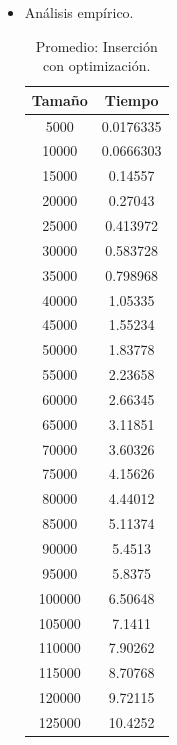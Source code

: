 \documentclass[a4paper,12pt,twoside]{article} %
\begin{document}
\begin{itemize}
	
	\item Análisis empírico.
	
\begin{table}[h]
	\begin{center}
		\begin{tabular}{|c|c|}
		\hline
		Tamaño & Tiempo \\
		\hline
		5000 & 0.0176335 \\
		10000 & 0.0666303 \\
		15000 & 0.14557 \\
		20000 & 0.27043 \\
		25000 & 0.413972 \\
		30000 & 0.583728 \\
		35000 & 0.798968 \\
		40000 & 1.05335 \\
		45000 & 1.55234 \\
		50000 & 1.83778 \\
		55000 & 2.23658 \\
		60000 & 2.66345 \\
		65000 & 3.11851 \\
		70000 & 3.60326 \\
		75000 & 4.15626 \\
		80000 & 4.44012 \\
		85000 & 5.11374 \\
		90000 & 5.4513 \\
		95000 & 5.8375 \\
		100000 & 6.50648 \\
		105000 & 7.1411 \\
		110000 & 7.90262 \\
		115000 & 8.70768 \\
		120000 & 9.72115 \\
		125000 & 10.4252 \\
		\hline
		\end{tabular}
	\end{center}
	\caption{Promedio: Inserción con optimización.}
\end{table}
\newpage

\begin{figure}[h]
  \begin{center}
  

\end{center}
\end{figure}
\end{itemize}
\end{document}
